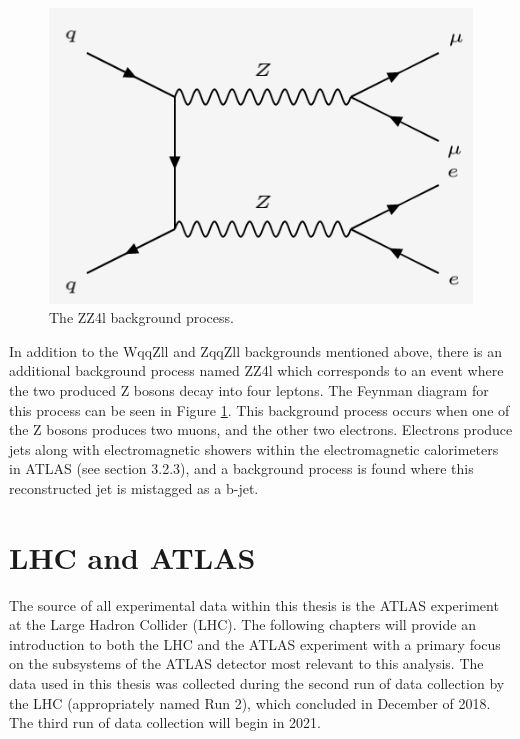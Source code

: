 \documentclass[12pt,a4paper,epsf,portrait,times,epsfig]{article}
\begin{document}
		\begin{figure}[h!]
			\centering
			\includegraphics[scale=0.45]{ZZ4l}
			\caption{The ZZ4l background process.}
			\label{Fig:ZZ4lFeynman}
		\end{figure}
		
		
		In addition to the WqqZll and ZqqZll backgrounds mentioned above, there is an additional background process named ZZ4l which corresponds to an event where the two produced Z bosons decay into four leptons. The Feynman diagram for this process can be seen in Figure \ref{Fig:ZZ4lFeynman}. This background process occurs when one of the Z bosons produces two muons, and the other two electrons. Electrons produce jets along with
		electromagnetic showers within the electromagnetic calorimeters in ATLAS (see section 3.2.3), and a background process is found where this reconstructed jet is mistagged as a b-jet. \par
		
	\newpage

	\section{LHC and ATLAS}

		The source of all experimental data within this thesis is the ATLAS experiment at the Large Hadron Collider (LHC). The following chapters will provide an introduction to both the LHC and the ATLAS experiment with a primary focus on the subsystems of the ATLAS detector most relevant to this analysis. The data used in this thesis was collected during the second run of data collection by the LHC (appropriately named Run 2), which concluded in December of 2018. The third run of data collection will begin in 2021. 
\end{document}
